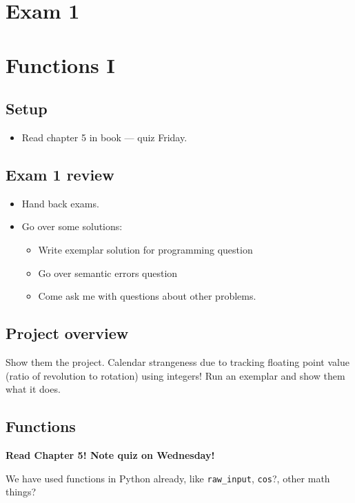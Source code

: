 \documentclass{article}
\begin{document}
\section{Exam 1}

\newpage

\section{Functions I}

\subsection*{Setup}
\begin{itemize}
\item Read chapter 5 in book --- quiz Friday.
\end{itemize}

\subsection*{Exam 1 review}
\begin{itemize}
\item Hand back exams.
\item Go over some solutions:
  \begin{itemize}
  \item Write exemplar solution for programming question
  \item Go over semantic errors question
  \item Come ask me with questions about other problems.
  \end{itemize}
\end{itemize}

\subsection*{Project overview}

Show them the project.  Calendar strangeness due to tracking floating
point value (ratio of revolution to rotation) using integers!  Run an
exemplar and show them what it does.

\subsection*{Functions}

\textbf{Read Chapter 5! Note quiz on Wednesday!}

We have used functions in Python already, like \verb|raw_input|,
\verb|cos|?, other math things?
\end{document}
